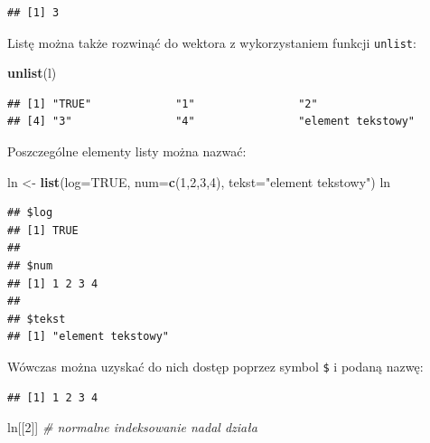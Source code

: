 \documentclass[]{book}
\newenvironment{Shaded}{\begin{snugshade}}{\end{snugshade}}
\newcommand{\KeywordTok}[1]{\textcolor[rgb]{0.13,0.29,0.53}{\textbf{#1}}}
\newcommand{\DataTypeTok}[1]{\textcolor[rgb]{0.13,0.29,0.53}{#1}}
\newcommand{\DecValTok}[1]{\textcolor[rgb]{0.00,0.00,0.81}{#1}}
\newcommand{\StringTok}[1]{\textcolor[rgb]{0.31,0.60,0.02}{#1}}
\newcommand{\CommentTok}[1]{\textcolor[rgb]{0.56,0.35,0.01}{\textit{#1}}}
\newcommand{\OtherTok}[1]{\textcolor[rgb]{0.56,0.35,0.01}{#1}}
\newcommand{\OperatorTok}[1]{\textcolor[rgb]{0.81,0.36,0.00}{\textbf{#1}}}
\newcommand{\NormalTok}[1]{#1}
\begin{document}
\begin{verbatim}
## [1] 3
\end{verbatim}

Listę można także rozwinąć do wektora z wykorzystaniem funkcji
\texttt{unlist}:

\begin{Shaded}
\begin{Highlighting}[]
\KeywordTok{unlist}\NormalTok{(l)}
\end{Highlighting}
\end{Shaded}

\begin{verbatim}
## [1] "TRUE"             "1"                "2"               
## [4] "3"                "4"                "element tekstowy"
\end{verbatim}

Poszczególne elementy listy można nazwać:

\begin{Shaded}
\begin{Highlighting}[]
\NormalTok{ln <-}\StringTok{ }\KeywordTok{list}\NormalTok{(}\DataTypeTok{log=}\OtherTok{TRUE}\NormalTok{, }\DataTypeTok{num=}\KeywordTok{c}\NormalTok{(}\DecValTok{1}\NormalTok{,}\DecValTok{2}\NormalTok{,}\DecValTok{3}\NormalTok{,}\DecValTok{4}\NormalTok{), }\DataTypeTok{tekst=}\StringTok{"element tekstowy"}\NormalTok{)}
\NormalTok{ln}
\end{Highlighting}
\end{Shaded}

\begin{verbatim}
## $log
## [1] TRUE
## 
## $num
## [1] 1 2 3 4
## 
## $tekst
## [1] "element tekstowy"
\end{verbatim}

Wówczas można uzyskać do nich dostęp poprzez symbol \texttt{\$} i podaną
nazwę:

\begin{Shaded}
\end{Shaded}

\begin{verbatim}
## [1] 1 2 3 4
\end{verbatim}

\begin{Shaded}
\begin{Highlighting}[]
\NormalTok{ln[[}\DecValTok{2}\NormalTok{]] }\CommentTok{# normalne indeksowanie nadal działa}
\end{Highlighting}
\end{Shaded}
\end{document}
